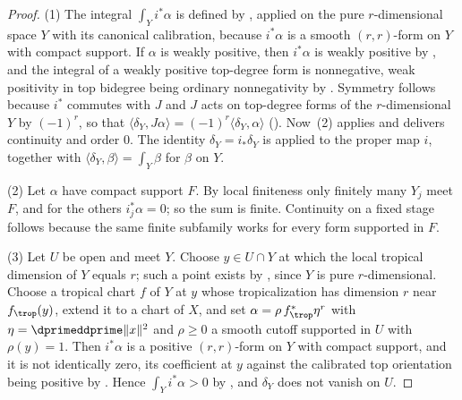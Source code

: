 \begin{proof}
(1) The integral $\int_Yi^*\alpha$ is defined by
, applied on the pure $r$-dimensional
space $Y$ with its canonical calibration, because $i^*\alpha$ is a smooth
$(r,r)$-form on $Y$ with compact support.  If $\alpha$ is weakly positive,
then $i^*\alpha$ is weakly positive by
, and the integral of a weakly positive
top-degree form is nonnegative, weak positivity in top bidegree being
ordinary nonnegativity by .  Symmetry
follows because $i^*$ commutes with $J$ and $J$ acts on top-degree forms of
the $r$-dimensional $Y$ by $(-1)^r$, so that
$\langle\delta_Y,J\alpha\rangle=(-1)^r\langle\delta_Y,\alpha\rangle$
().  Now
\,(2) applies and delivers continuity and
order $0$.  The identity $\delta_Y=i_*\delta_{Y}$ is
 applied to the proper map $i$, together with
$\langle\delta_Y,\beta\rangle=\int_Y\beta$ for $\beta$ on $Y$.

(2) Let $\alpha$ have compact support $F$.  By local finiteness only finitely
many $Y_j$ meet $F$, and for the others $i_j^*\alpha=0$; so the sum is
finite.  Continuity on a fixed stage follows because the same finite
subfamily works for every form supported in $F$.

(3) Let $U$ be open and meet $Y$.  Choose $y\in U\cap Y$ at which the local
tropical dimension of $Y$ equals $r$; such a point exists by
, since $Y$ is pure $r$-dimensional.
Choose a tropical chart $f$ of $Y$ at $y$ whose tropicalization has dimension
$r$ near $f_{\trop}(y)$, extend it to a chart of $X$, and set
$\alpha=\rho\,f_{\trop}^*\eta^{r}$ with $\eta=\dprimeddprime\|x\|^2$ and
$\rho\ge0$ a smooth cutoff supported in $U$ with $\rho(y)=1$.  Then
$i^*\alpha$ is a positive $(r,r)$-form on $Y$ with compact support, and it is
not identically zero, its coefficient at $y$ against the calibrated top
orientation being positive by .  Hence
$\int_Yi^*\alpha>0$ by \cite[Corollary~7.3.7]{CLD25}, and $\delta_Y$ does not
vanish on $U$.
\end{proof}


